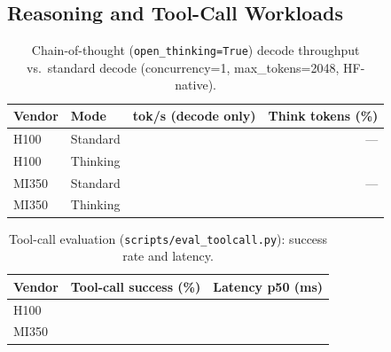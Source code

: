 \subsection{Reasoning and Tool-Call Workloads}
\label{sec:inference:reasoning}

\begin{table}[h]
\centering
\caption{Chain-of-thought (\texttt{open\_thinking=True}) decode throughput
vs.\ standard decode (concurrency=1, max\_tokens=2048, HF-native).}
\label{tab:thinking}
\small
\begin{tabular}{llrr}
\toprule
\textbf{Vendor} & \textbf{Mode} & \textbf{tok/s (decode only)} & \textbf{Think tokens (\%)} \\
\midrule
H100  & Standard  & \PH{} & --- \\
H100  & Thinking  & \PH{} & \PH{} \\
MI350 & Standard  & \PH{} & --- \\
MI350 & Thinking  & \PH{} & \PH{} \\
\bottomrule
\end{tabular}
\end{table}

\begin{table}[h]
\centering
\caption{Tool-call evaluation (\texttt{scripts/eval\_toolcall.py}): success rate and latency.}
\label{tab:toolcall}
\small
\begin{tabular}{lrr}
\toprule
\textbf{Vendor} & \textbf{Tool-call success (\%)} & \textbf{Latency p50 (ms)} \\
\midrule
H100  & \PH{} & \PH{} \\
MI350 & \PH{} & \PH{} \\
\bottomrule
\end{tabular}
\end{table}
